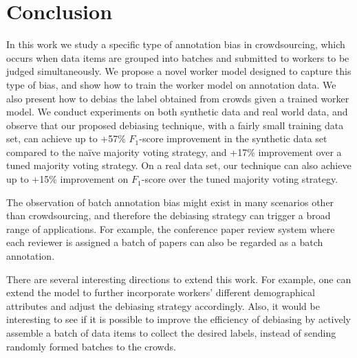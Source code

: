 \section{Conclusion}
\label{sec:conclusion}

In this work we study a specific type of annotation bias in crowdsourcing, 
which occurs when data items are grouped into batches 
and submitted to workers to be judged simultaneously.  
We propose a novel worker model designed to capture this type of bias, 
and show how to train the worker model on annotation data.  
We also present how to debias the label obtained from crowds given a trained worker model.  
We conduct experiments on both synthetic data and real world data, %
and observe that our proposed debiasing technique, 
with a fairly small training data set, 
can achieve up to +57\% $F_1$-score improvement in the synthetic data set 
compared to the na\"{i}ve majority voting strategy, 
and +17\% improvement over a tuned majority voting strategy.   
On a real data set, our technique can also achieve up to +15\% improvement on $F_1$-score
over the tuned majority voting strategy.  


The observation of batch annotation bias might exist in many scenarios other than crowdsourcing, 
and therefore the debiasing strategy can trigger a broad range of applications. 
For example, the conference paper review system where each reviewer is assigned a batch of papers 
can also be regarded as a batch annotation.  

There are several interesting directions to extend this work.  
For example, one can extend the model to further incorporate workers' different demographical attributes 
and adjust the debiasing strategy accordingly.  
Also, it would be interesting to see if it is possible to improve the efficiency of debiasing 
by actively assemble a batch of data items to collect the desired labels, 
instead of sending randomly formed batches to the crowds.  


